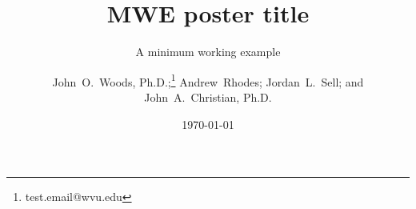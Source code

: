 \documentclass[final]{beamer}
\title[MWE]{MWE poster title}
\subtitle{A minimum working example}
\author[Woods \& Christian]{John~O.~Woods, Ph.D.;\thanks{test.email@wvu.edu} Andrew~Rhodes; Jordan~L.~Sell; and John~A.~Christian, Ph.D.}
\institute[West Virginia University]{Department of Mechanical and Aerospace Engineering, West Virginia University}
\date{\today}
\makeatletter
\newcommand{\insertthanks}{\@thanks}
\makeatother
\begin{document}
\begin{frame}
    \insertauthor
    \insertauthor

    \insertthanks
\end{frame}
\end{document}
